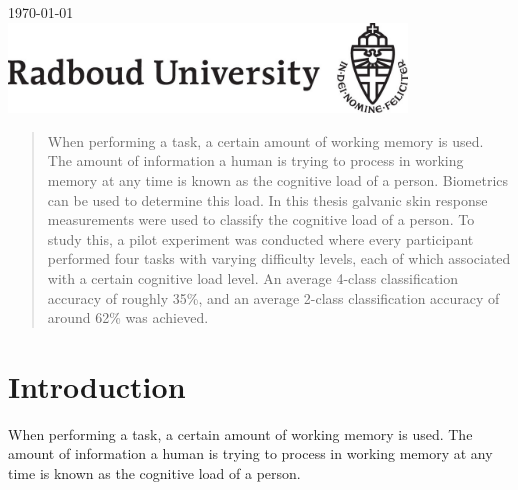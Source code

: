 \documentclass[11pt,leqno,a4paper]{report} %
\begin{document}
\begin{titlepage}

{\large \today}\\[3cm] %


\includegraphics[width=300pt]{radlogo.jpg}%
 

\vfill %

\end{titlepage}


\tableofcontents 
\thispagestyle{empty}
\addcontentsline



\begin{abstract}
When performing a task, a certain amount of working memory is used. The amount of information a human is trying to process in working memory at any time is known as the cognitive load of a person. Biometrics can be used to determine this load. In this thesis galvanic skin response measurements were used to classify the cognitive load of a person. To study this, a pilot experiment was conducted where every participant performed four tasks with varying difficulty levels, each of which associated with a certain cognitive load level. An average 4-class classification accuracy of roughly 35\%, and an average 2-class classification accuracy of around 62\% was achieved.

\end{abstract}


\chapter{Introduction}
When performing a task, a certain amount of working memory is used. The amount of information a human is trying to process in working memory at any time is known as the cognitive load of a person. 
\end{document}
